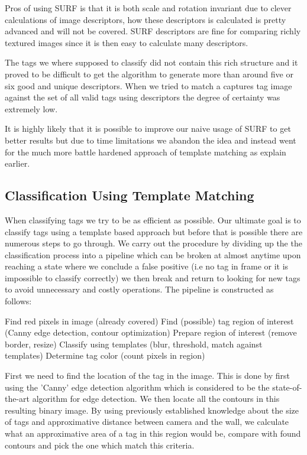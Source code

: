 Pros of using SURF is that it is both scale and rotation invariant due to clever calculations of image descriptors, how these descriptors is calculated is pretty advanced and will not be covered. SURF descriptors are fine for comparing richly textured images since it is then easy to calculate many descriptors.

The tags we where supposed to classify did not contain this rich structure and it proved to be difficult to get the algorithm to generate more than around five or six good and unique descriptors. When we tried to match a captures tag image against the set of all valid tags using descriptors the degree of certainty was extremely low. 

It is highly likely that it is possible to improve our naive usage of SURF to get better results but due to time limitations we abandon the idea and instead went for the much more battle hardened approach of template matching as explain earlier.

\subsection{Classification Using Template Matching}
When classifying tags we try to be as efficient as possible. Our ultimate goal is to classify tags using a template based approach but before that is possible there are numerous steps to go through. We carry out the procedure by dividing up the the classification process into a pipeline which can be broken at almost anytime upon reaching a state where we conclude a false positive (i.e no tag in frame or it is impossible to classify correctly) we then break and return to looking for new tags to avoid unnecessary and costly operations. The pipeline is constructed as follows:

Find red pixels in image (already covered)
Find (possible) tag region of interest (Canny edge detection, contour optimization)
Prepare region of interest (remove border, resize)
Classify using templates (blur, threshold, match against templates)
Determine tag color (count pixels in region)

First we need to find the location of the tag in the image. This is done by first using the 'Canny' edge detection algorithm which is considered to be the state-of-the-art algorithm for edge detection. We then locate all the contours in this resulting binary image. By using previously established knowledge about the size of tags and approximative distance between camera and the wall, we calculate what an approximative area of a tag in this region would be, compare with found contours and pick the one which match this criteria. 

